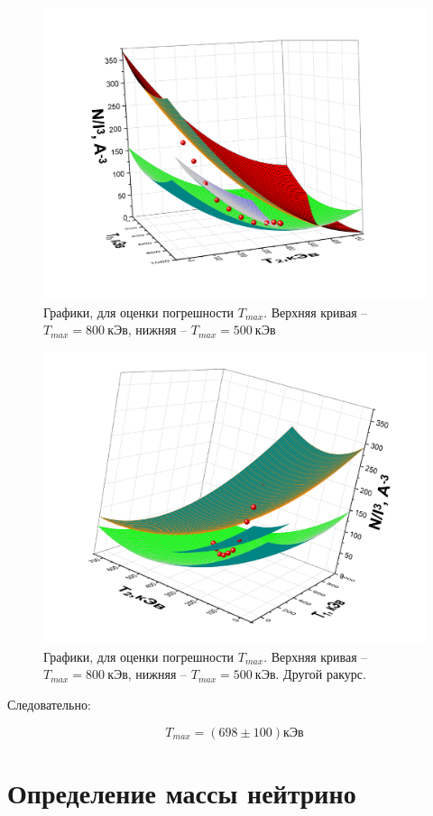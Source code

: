 \documentclass[a4paper,12pt]{article}
\begin{document}
\begin{figure}[h!]
	\centering
	\includegraphics[width=0.8\linewidth]{graph6}
	\caption{Графики, для оценки погрешности $T_{max}$. Верхняя кривая -- $T_{max} = 800 \ кЭв$, нижняя -- $T_{max} = 500 \ кЭв$}
\end{figure}

\begin{figure}[h!]
	\centering
	\includegraphics[width=0.8\linewidth]{graph7}
	\caption{Графики, для оценки погрешности $T_{max}$. Верхняя кривая -- $T_{max} = 800 \ кЭв$, нижняя -- $T_{max} = 500 \ кЭв$. Другой ракурс.}
\end{figure}

\pagebreak

Следовательно:

$$
	T_{max} = (698 \pm 100) кЭв
$$

\section*{Определение массы нейтрино}
\end{document}
